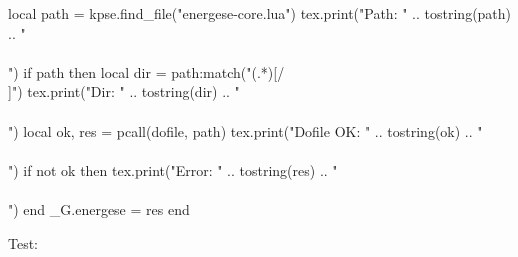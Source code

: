 \documentclass{article}
\begin{document}
\begin{luacode*}
    local path = kpse.find_file("energese-core.lua")
    tex.print("Path: " .. tostring(path) .. "\\\\")
    if path then
        local dir = path:match("(.*)[/\\]")
        tex.print("Dir: " .. tostring(dir) .. "\\\\")
        local ok, res = pcall(dofile, path)
        tex.print("Dofile OK: " .. tostring(ok) .. "\\\\")
        if not ok then tex.print("Error: " .. tostring(res) .. "\\\\") end
        _G.energese = res
    end
\end{luacode*}
Test: 
\end{document}
